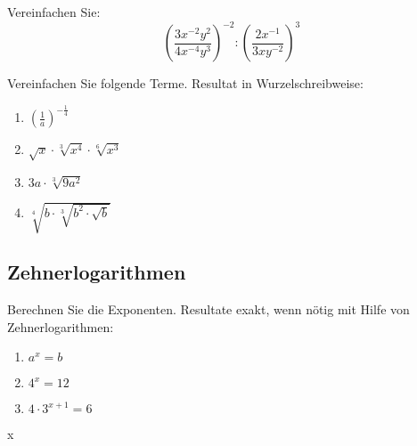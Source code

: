 Vereinfachen Sie:
$$\left(\frac{3x^{-2}y^2}{4x^{-4}y^3}\right)^{-2} : \left(\frac{2x^{-1}}{3xy^{-2}}\right)^3$$


Vereinfachen Sie folgende Terme. Resultat in Wurzelschreibweise:

\begin{multicols}{2}
\begin{enumerate}[label=\alph*)]
\item $\left(\frac{1}{a}\right)^{-\frac{1}{4}}$
\item $\sqrt{x}\cdot \sqrt[3]{x^4} \cdot \sqrt[6]{x^3}$
  \item $3a\cdot \sqrt[3]{9a^2}$
\item $\sqrt[4]{b\cdot \sqrt[3]{b^2\cdot \sqrt{b}}}$
\end{enumerate}
\end{multicols}

\subsection{Zehnerlogarithmen}

Berechnen Sie die Exponenten. Resultate exakt, wenn nötig mit Hilfe von
Zehnerlogarithmen:

\begin{multicols}{2}
\begin{enumerate}[label=\alph*)]
\item $a^x=b$
\item $4^x=12$
  \item $4\cdot 3^{x+1}=6$
\end{enumerate}
\end{multicols}x
